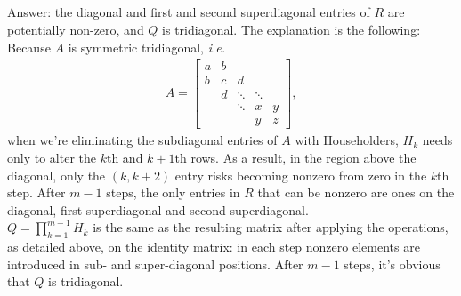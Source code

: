 \documentclass[11pt]{article}
\begin{document}
\subsection{}
Answer: the diagonal and first and second superdiagonal entries of $R$ are potentially non-zero, and $Q$ is tridiagonal. The explanation is the following:\\[0.3cm]
Because $A$ is symmetric tridiagonal, \textit{i.e.} 
\begin{equation}\begin{split} 
A = \begin{bmatrix} 
a & b\\
b & c & d\\
& d & \ddots & \ddots\\
& & \ddots & x  & y \\
& & & y & z
\end{bmatrix},
\end{split}\nonumber\end{equation} 
when we're eliminating the subdiagonal entries of $A$ with Householders, $H_k$ needs only to alter the $k$th and $k+1$th rows. As a result, in the region above the diagonal, only the $(k,k+2)$ entry risks becoming nonzero from zero in the $k$th step. After $m-1$ steps, the only entries in $R$ that can be nonzero are ones on the diagonal, first superdiagonal and second superdiagonal. \\[0.3cm]
$Q=\prod_{k=1}^{m-1}H_k$ is the same as the resulting matrix after applying the operations, as detailed above, on the identity matrix: in each step nonzero elements are introduced in sub- and super-diagonal positions. After $m-1$ steps, it's obvious that $Q$ is tridiagonal.
\end{document}
